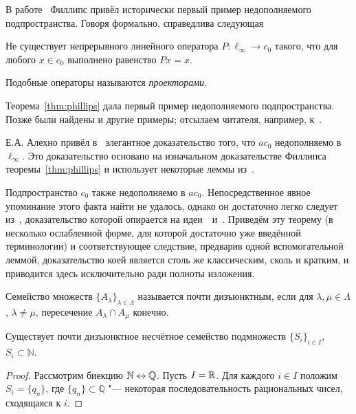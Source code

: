 \label{sec:noncomplementarity}

В работе~\cite{phillips1940linear} Филлипс привёл исторически первый пример недополняемого подпространства.
Говоря формально, справедлива следующая


\begin{theorem}[Филлипса]
	\label{thm:phillips}
	Не существует непрерывного линейного оператора $P: \ell_\infty \to c_0$ такого, что для любого
	$x \in c_0$ выполнено равенство $Px =x$.
\end{theorem}
Подобные операторы называются \emph{проекторами}.

Теорема~\ref{thm:phillips} дала первый пример недополняемого подпространства.
Позже были найдены и другие примеры;
отсылаем читателя, например, к~\cite{lindenstrauss1979classical}.

Е.А. Алехно привёл в~\cite[теорема 8]{alekhno2006propertiesII} элегантное доказательство
того, что $ac_0$ недополняемо в $\ell_\infty$.
Это доказательство основано на изначальном доказательстве Филлипса теоремы~\ref{thm:phillips}
и использует некоторые леммы из~\cite{phillips1940linear}.

Подпространство $c_0$ также недополняемо в $ac_0$.
Непосредственное явное упоминание этого факта найти не удалось, однако он достаточно легко следует из~\cite[теорема 4]{ASSU2},
доказательство которой опирается на идеи~\cite{whitley1968projecting}~и~\cite[теорема 6.9]{Carothers}.
Приведём эту теорему (в несколько ослабленной форме, для которой достаточно уже введённой терминологии)
и соответствующее следствие, предварив одной вспомогательной леммой, доказательство коей является столь же классическим, сколь и кратким,
и приводится здесь исключительно ради полноты изложения.

\begin{definition}
	Семейство множеств $\{A_\lambda\}_{\lambda \in \Lambda}$ называется почти дизъюнктным,
	если для $\lambda, \mu \in \Lambda$, $\lambda \ne \mu$,
	пересечение $A_\lambda \cap A_\mu$ конечно.
\end{definition}

\begin{lemma}
	\label{lem:uncountable_subsets_of_N_with_finite_intersections}
	Существует почти дизъюнктное несчётное семейство подмножеств $\{S_i\}_{i\in I}$, $S_i \subset \mathbb{N}$.
\end{lemma}

\begin{proof}
	Рассмотрим биекцию $\mathbb{N} \leftrightarrow \mathbb{Q}$.
	Пусть $I = \mathbb{R}$.
	Для каждого $i\in I$ положим $S_i = \{q_n\}$,
	где $\{q_n\} \subset \mathbb{Q}$ "--- некоторая последовательность рациональных чисел,
	сходящаяся к $i$.
\end{proof}

